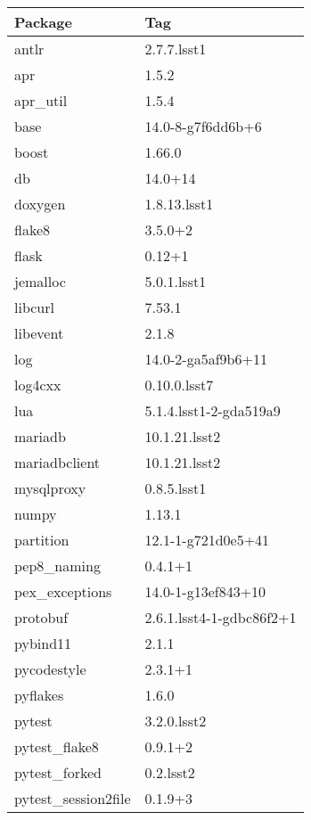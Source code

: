 \documentclass[DM,lsstdraft,STR,toc]{lsstdoc}
\begin{document}
\begin{table}[h]
\centering
\begin{tabular}{l l}
Package & Tag \\ \hline
antlr              &   2.7.7.lsst1  \\
apr                &   1.5.2       \\
apr\_util           &   1.5.4       \\
base               &   14.0-8-g7f6dd6b+6  \\
boost              &   1.66.0      \\
db                 &   14.0+14     \\
doxygen            &   1.8.13.lsst1  \\
flake8             &   3.5.0+2     \\
flask              &   0.12+1      \\
jemalloc           &   5.0.1.lsst1  \\
libcurl            &   7.53.1      \\
libevent           &   2.1.8       \\
log                &   14.0-2-ga5af9b6+11  \\
log4cxx            &   0.10.0.lsst7  \\
lua                &   5.1.4.lsst1-2-gda519a9  \\
mariadb            &   10.1.21.lsst2  \\
mariadbclient      &   10.1.21.lsst2  \\
mysqlproxy         &   0.8.5.lsst1  \\
numpy              &   1.13.1      \\
partition          &   12.1-1-g721d0e5+41  \\
pep8\_naming        &   0.4.1+1     \\
pex\_exceptions     &   14.0-1-g13ef843+10  \\
protobuf           &   2.6.1.lsst4-1-gdbc86f2+1  \\
pybind11           &   2.1.1       \\
pycodestyle        &   2.3.1+1     \\
pyflakes           &   1.6.0       \\
pytest             &   3.2.0.lsst2  \\
pytest\_flake8      &   0.9.1+2     \\
pytest\_forked      &   0.2.lsst2   \\
pytest\_session2file &  0.1.9+3     \\

\end{tabular}
\end{table}
\end{document}
